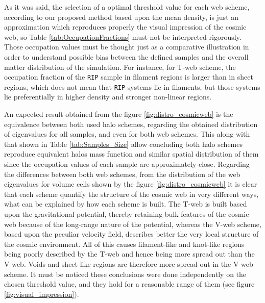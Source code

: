 \documentclass[usenatbib]{latex/mn2e}
\begin{document}
As it was said, the selection of a optimal threshold value for each web 
scheme, according to our proposed method based upon the mean density, is 
just an approximation which reproduces properly the visual impression of 
the cosmic web, so Table \ref{tab:OccupationFractions} must not be 
interpreted rigorously. Those occupation values must be thought just as a 
comparative illustration in order to understand possible bias between the 
defined samples and the overall matter distribution of the simulation. For 
instance, for T-web scheme, the occupation fraction of the \texttt{RIP} 
sample in filament regions is larger than in sheet regions, which does not 
mean that \texttt{RIP} systems lie in filaments, but those systems lie 
preferentially in higher density and stronger non-linear regions.



An expected result obtained from the figure \ref{fig:distro_cosmicweb} is 
the equivalence between both used halo schemes, regarding the obtained 
distribution of eigenvalues for all samples, and even for both web schemes.
This along with that shown in Table \ref{tab:Samples_Size} allow 
concluding both halo schemes reproduce equivalent halos mass function and 
similar spatial distribution of them since the occupation values of each 
sample are approximately close. 
Regarding the differences between both web schemes, from the distribution 
of the web eigenvalues for volume cells shown by the figure 
\ref{fig:distro_cosmicweb} it is clear that each scheme quantify the 
structure of the cosmic web in very different ways, what can be explained 
by how each scheme is built. The T-web is built based upon the 
gravitational potential, thereby retaining bulk features of the cosmic web 
because of the long-range nature of the potential, whereas the V-web 
scheme, based upon the peculiar velocity field, describes better the very 
local structure of the cosmic environment. All of this causes filament-like
and knot-like regions being poorly described by the T-web and hence being 
more spread out than the V-web. Voids and sheet-like regions are therefore 
more spread out in the V-web scheme. It must be noticed these conclusions 
were done independently on the chosen threshold value, and they hold for a 
reasonable range of them (see figure \ref{fig:visual_impression}).
\end{document}
